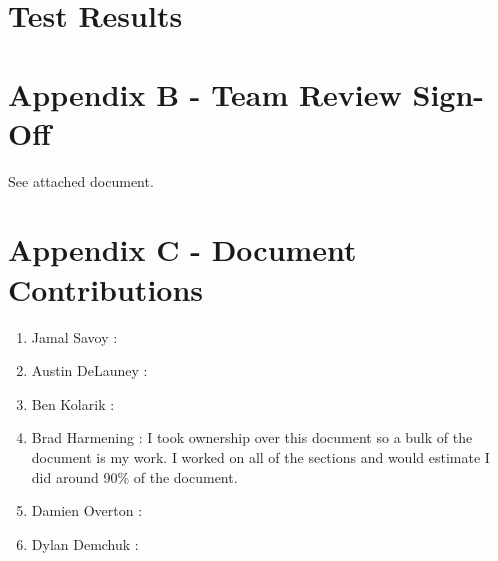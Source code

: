 \documentclass{article}
\begin{document}
\vspace{2.5mm}
\section{Test Results}\label{sec:testResults}

\vspace{2.5mm}



\section{Appendix B - Team Review Sign-Off}\label{sec:appendixB}

\vspace{2.5mm}

\begin{addmargin}[2em]{0em}

See attached document.

\end{addmargin}

\section{Appendix C - Document Contributions}\label{sec:appendixC}

\vspace{2.5mm}

\begin{addmargin}[2em]{0em}
\begin{enumerate}

\item Jamal Savoy : 

\item Austin DeLauney : 

\item Ben Kolarik : 

\item Brad Harmening : I took ownership over this document so a bulk of the document is my work. I worked on all of the sections and would estimate I did around 90\% of the document.

\item Damien Overton : 

\item Dylan Demchuk : 

\end{enumerate}
\end{addmargin}
\end{document}
